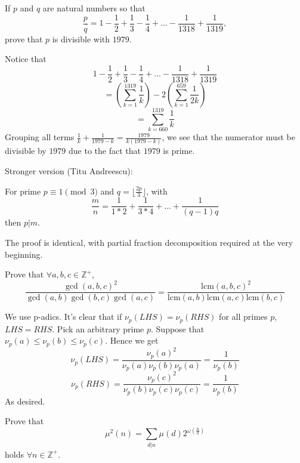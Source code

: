 \documentclass[11pt]{scrartcl}
\begin{document}
\begin{example}
  [IMO 1979]
  If $p$ and $q$ are natural numbers so that\[ \frac{p}{q}=1-\frac{1}{2}+\frac{1}{3}-\frac{1}{4}+ \ldots -\frac{1}{1318}+\frac{1}{1319}, \]prove that $p$ is divisible with $1979$.
\end{example}
\begin{soln}
  Notice that
  $$1-\frac{1}{2}+\frac{1}{3}-\frac{1}{4}+...-\frac{1}{1318}+\frac{1}{1319}$$
  $$=\left(\sum_{k=1}^{1319}\frac{1}{k}\right)-2\left(\sum_{k=1}^{659}\frac{1}{2k}\right)$$
  $$=\sum_{k=660}^{1319}\frac{1}{k}$$
  Grouping all terms $\frac{1}{k}+\frac{1}{1979-k}=\frac{1979}{k(1979-k)}$, we see that the numerator must be divisible by $1979$ due to the fact that $1979$ is prime.


  Stronger version (Titu Andreescu):

  For prime $p\equiv 1\pmod{3}$ and $q=\lfloor \frac{2p}{3}\rfloor$, with
  $$\frac{m}{n}=\frac{1}{1*2}+\frac{1}{3*4}+...+\frac{1}{(q-1)q}$$
  then $p|m$.

  The proof is identical, with partial fraction decomposition required at the very beginning.
\end{soln}
\begin{example}
  [USAMO 1972]
  Prove that $\forall a,b,c\in\mathbb{Z}^{+}$,
  $$\frac{\gcd(a,b,c)^2}{\gcd(a,b)\gcd(b,c)\gcd(a,c)}=\frac{\mathrm{lcm}(a,b,c)^2}{\mathrm{lcm}(a,b)\mathrm{lcm}(a,c)\mathrm{lcm}(b,c)}$$
\end{example}
\begin{soln}
  We use p-adics. It's clear that if $\nu_p(LHS)=\nu_p(RHS)$ for all primes $p$, $LHS=RHS$.
  Pick an arbitrary prime $p$. Suppose that $\nu_p(a)\le \nu_p(b)\le \nu_p(c)$. Hence we get
  $$\nu_p(LHS)=\frac{\nu_p(a)^2}{\nu_p(a)\nu_p(b)\nu_p(a)}=\frac{1}{\nu_p(b)}$$
  $$\nu_p(RHS)=\frac{\nu_p(c)^2}{\nu_p(b)\nu_p(c)\nu_p(c)}=\frac{1}{\nu_p(b)}$$
  As desired.
\end{soln}
\begin{example}
  [Classic]
  Prove that
  $$\mu^2(n)=\sum_{d|n}\mu(d)2^{\omega\left(\frac{n}{d}\right)}$$
  holds $\forall n\in\mathbb{Z}^+$.
\end{example}
\end{document}
